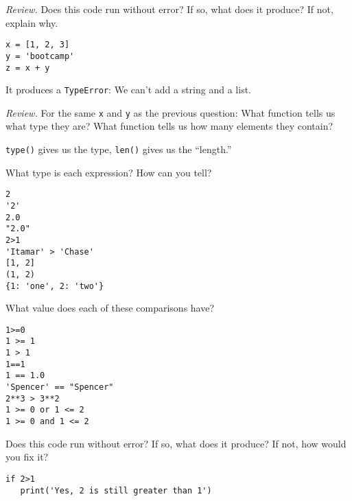 \documentclass[11pt]{exam}
\begin{document}
\begin{questions}
\item {\it Review.\/} Does this code run without error? If so, what does it produce?  If not, explain why.
\begin{verbatim}
x = [1, 2, 3]
y = 'bootcamp'
z = x + y
\end{verbatim}

\begin{solution}
It produces a {\tt TypeError}:  We can't add a string and a list.
\end{solution}

\item {\it Review.\/} For the same {\tt x} and {\tt y} as the previous question:
What function tells us what type they are?
What function tells us how many elements they contain?

\begin{solution}
{\tt type()} gives us the type, {\tt len()} gives us the ``length.''
\end{solution}



\item What type is each expression?  How can you tell?
\begin{verbatim}
2
'2'
2.0
"2.0"
2>1
'Itamar' > 'Chase'
[1, 2]
(1, 2)
{1: 'one', 2: 'two'}
\end{verbatim}

\item What value does each of these comparisons have?
\begin{verbatim}
1>=0
1 >= 1
1 > 1
1==1
1 == 1.0
'Spencer' == "Spencer"
2**3 > 3**2
1 >= 0 or 1 <= 2
1 >= 0 and 1 <= 2
\end{verbatim}

\item  Does this code run without error?  If so, what does it produce?  If not, how would you fix it?
\begin{verbatim}
if 2>1
   print('Yes, 2 is still greater than 1')
\end{verbatim}


\end{questions}
\end{document}
